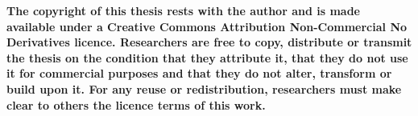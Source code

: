\clearpage
\textbf{The copyright of this thesis rests with the author and is made available under a Creative Commons 
Attribution Non-Commercial No Derivatives licence. Researchers are free to copy, distribute or 
transmit the thesis on the condition that they attribute it, that they do not use it for commercial 
purposes and that they do not alter, transform or build upon it. For any reuse or redistribution, 
researchers must make clear to others the licence terms of this work.}
